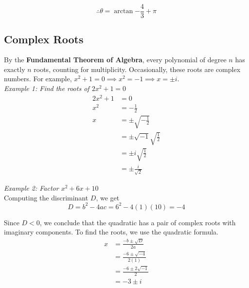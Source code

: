         \begin{equation*}
            \therefore \theta = \arctan{-\frac{4}{3}}+\pi
        \end{equation*}



    \subsection{Complex Roots}
        By the \textbf{Fundamental Theorem of Algebra}, every polynomial of degree $n$ has exactly
        $n$ roots, counting for multiplicity. Occasionally, these roots are complex numbers.
        For example, $x^2+1=0\implies x^2=-1\implies x=\pm i$. \\

        \noindent \textit{Example 1: Find the roots of $2x^2+1=0$} \\
        \begin{align*}
            2x^2 + 1 &= 0 \\
            x^2 &= -\frac{1}{2} \\
            x &= \pm \sqrt{-\frac{1}{2}} \\
            &= \pm \sqrt{-1} \sqrt{\frac{1}{2}} \\
            &= \pm i\sqrt{\frac{1}{2}} \\
            &= \pm \frac{i}{\sqrt{2}}
        \end{align*}

        \noindent \textit{Example 2: Factor $x^2+6x+10$} \\
        Computing the discriminant $D$, we get \\

        \begin{equation*}
            D = b^2-4ac = 6^2-4(1)(10) = -4
        \end{equation*}

        \noindent Since $D<0$, we conclude that the quadratic has a pair of complex roots with
        imaginary components. To find the roots, we use the quadratic formula. \\

        \begin{align*}
            x &= \frac{-b\pm\sqrt{D}}{2a} \\
            &= \frac{-6\pm\sqrt{-4}}{2(1)} \\
            &= \frac{-6\pm 2\sqrt{-1}}{2} \\
            &= -3 \pm i
        \end{align*}

